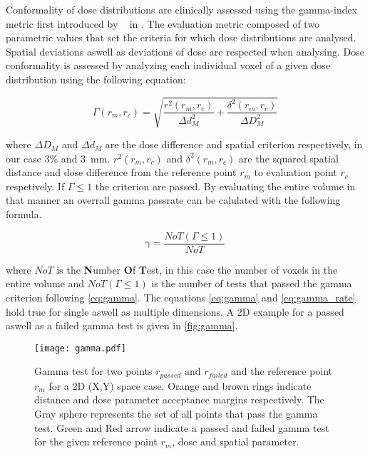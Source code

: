 Conformality of dose distributions are clinically assessed using the gamma-index metric first introduced by \citeauthor{low_technique_1998}~\cite{low_technique_1998} in \citeyear{low_technique_1998}. The evaluation metric composed of two parametric values that set the criteria for which dose distributions are analysed. Spatial deviations aswell as deviations of dose are respected when analysing. Dose conformality is assessed by analyzing each individual voxel of a given dose distribution using the following equation:

\begin{equation}\label{eq:gamma}
    \Gamma (r_m, r_c) = \sqrt{\frac{r^2(r_m,r_c)}{\Delta d^2_M} + \frac{\delta ^2(r_m,r_c)}{\Delta D^2_M}}
\end{equation}

where $\Delta D_M$ and $\Delta d_M$ are the dose difference and spatial criterion respectively, in our case 3\% and 3~mm.  $r^2(r_m,r_c)$ and $\delta ^2(r_m,r_c)$ are the squared spatial distance and dose difference from the reference point $r_m$ to evaluation point $r_c$ respetively. If $\Gamma \leq 1$ the criterion are passed. By evaluating the entire volume in that manner an overrall gamma passrate can be calulated with the following formula. 

\begin{equation}\label{eq:gamma_rate}
    \gamma = \frac{NoT(\Gamma \leq 1)}{NoT}
\end{equation}

where $NoT$ is the \textbf{N}umber \textbf{O}f \textbf{T}est, in this case the number of voxels in the entire volume and $NoT(\Gamma \leq 1)$ is the number of tests that passed the gamma criterion following \autoref{eq:gamma}. The equations \autoref{eq:gamma} and \autoref{eq:gamma_rate} hold true for single aswell as multiple dimensions. A 2D example for a passed aswell as a failed gamma test is given in \autoref{fig:gamma}. 

\begin{figure}
    \centering
    \texttt{[image: gamma.pdf]}
    \caption{Gamma test for two points $r_{passed}$ and $r_{failed}$ and the reference point $r_m$ for a 2D (X,Y) space case. Orange and brown rings indicate distance and dose parameter acceptance margins respectively. The Gray sphere represents the set of all points that pass the gamma test. Green and Red arrow indicate a passed and failed gamma test for the given reference point $r_m$, dose and spatial parameter.}\label{fig:gamma}
\end{figure}

